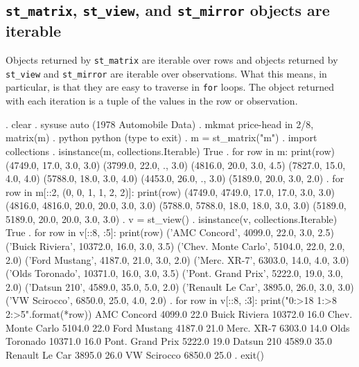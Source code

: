 \documentclass{article}
\begin{document}
\subsection{\lstinline$st_matrix$, \lstinline$st_view$, and \lstinline$st_mirror$ objects are iterable} \label{iterable}

Objects returned by \lstinline{st_matrix} are iterable over rows and objects returned by \lstinline{st_view} and \lstinline{st_mirror} are iterable over observations. What this means, in particular, is that they are easy to traverse in \lstinline{for} loops. The object returned with each iteration is a tuple of the values in the row or observation.

\begin{stlog}
. clear
{\smallskip}
. sysuse auto
(1978 Automobile Data)
{\smallskip}
. mkmat price-head in 2/8, matrix(m)
{\smallskip}
. python
 python (type {} to exit) 
. m = st_matrix("m")
{\smallskip}
. import collections
{\smallskip}
. isinstance(m, collections.Iterable)
True
{\smallskip}
. for row in m: print(row)
(4749.0, 17.0, 3.0, 3.0)
(3799.0, 22.0, ., 3.0)
(4816.0, 20.0, 3.0, 4.5)
(7827.0, 15.0, 4.0, 4.0)
(5788.0, 18.0, 3.0, 4.0)
(4453.0, 26.0, ., 3.0)
(5189.0, 20.0, 3.0, 2.0)
{\smallskip}
. for row in m[::2, (0, 0, 1, 1, 2, 2)]: print(row)
(4749.0, 4749.0, 17.0, 17.0, 3.0, 3.0)
(4816.0, 4816.0, 20.0, 20.0, 3.0, 3.0)
(5788.0, 5788.0, 18.0, 18.0, 3.0, 3.0)
(5189.0, 5189.0, 20.0, 20.0, 3.0, 3.0)
{\smallskip}
. v = st_view()
{\smallskip}
. isinstance(v, collections.Iterable)
True
{\smallskip}
. for row in v[::8, :5]: print(row)
('AMC Concord', 4099.0, 22.0, 3.0, 2.5)
('Buick Riviera', 10372.0, 16.0, 3.0, 3.5)
('Chev. Monte Carlo', 5104.0, 22.0, 2.0, 2.0)
('Ford Mustang', 4187.0, 21.0, 3.0, 2.0)
('Merc. XR-7', 6303.0, 14.0, 4.0, 3.0)
('Olds Toronado', 10371.0, 16.0, 3.0, 3.5)
('Pont. Grand Prix', 5222.0, 19.0, 3.0, 2.0)
('Datsun 210', 4589.0, 35.0, 5.0, 2.0)
('Renault Le Car', 3895.0, 26.0, 3.0, 3.0)
('VW Scirocco', 6850.0, 25.0, 4.0, 2.0)
{\smallskip}
. for row in v[::8, :3]: print("{\lbr}0:>18{\rbr} {\lbr}1:>8{\rbr} {\lbr}2:>5{\rbr}".format(*row))
       AMC Concord   4099.0  22.0
     Buick Riviera  10372.0  16.0
 Chev. Monte Carlo   5104.0  22.0
      Ford Mustang   4187.0  21.0
        Merc. XR-7   6303.0  14.0
     Olds Toronado  10371.0  16.0
  Pont. Grand Prix   5222.0  19.0
        Datsun 210   4589.0  35.0
    Renault Le Car   3895.0  26.0
       VW Scirocco   6850.0  25.0
{\smallskip}
. exit()
\end{stlog}
\end{document}
